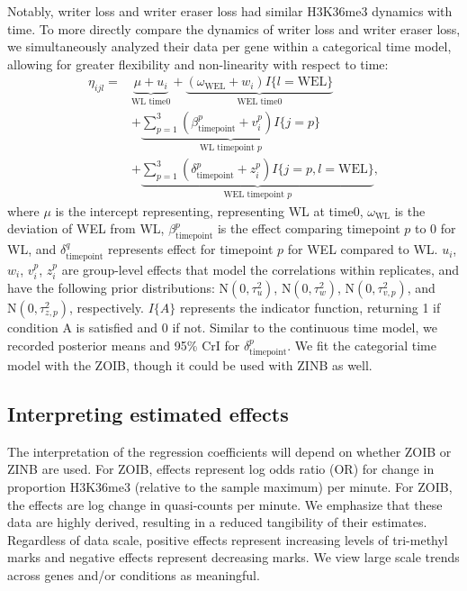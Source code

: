 \documentclass[12pt]{extarticle}
\begin{document}
Notably, writer loss and writer eraser loss had similar H3K36me3 dynamics with time. To more directly compare the dynamics of writer loss and writer eraser loss, we simultaneously analyzed their data per gene within a categorical time model, allowing for greater flexibility and non-linearity with respect to time:
\begin{align}
	\eta_{ijl} = &\underbrace{\mu + u_{i}}_{\text{WL time0}} + \underbrace{(\omega_{\text{WEL}} + w_{i})I\{l = \text{WEL}\}}_{\text{WEL time0}} \\ 
	&+ \underbrace{\sum_{p = 1}^{3}(\beta_{\text{timepoint}}^{p} + v_{i}^{p})I\{j = p\}}_{\text{WL timepoint }p} \nonumber \\ 
	&+ \underbrace{\sum_{p = 1}^{3}(\delta_{\text{timepoint}}^{p} + z_{i}^{p})I\{j = p, l = \text{WEL}\}}_{\text{WEL timepoint }p},\nonumber
\end{align}
where $\mu$ is the intercept representing, representing WL at time0, $\omega_{\text{WL}}$ is the deviation of WEL from WL, $\beta_{\text{timepoint}}^{p}$ is the effect comparing timepoint $p$ to $0$ for WL, and $\delta_{\text{timepoint}}^{q}$ represents effect for timepoint $p$ for WEL compared to WL. $u_{i}$, $w_{i}$, $v_{i}^{p}$, $z_{i}^{p}$ are group-level effects that model the correlations within replicates, and have the following prior distributions: $\text{N}(0, \tau^{2}_{u})$, $\text{N}(0, \tau^{2}_{w})$, $\text{N}(0, \tau^{2}_{v,p})$, and $\text{N}(0, \tau^{2}_{z,p})$, respectively. $I\{A\}$ represents the indicator function, returning 1 if condition A is satisfied and 0 if not. Similar to the continuous time model, we recorded posterior means and 95\% CrI for $\delta_{\text{timepoint}}^{p}$. We fit the categorial time model with the ZOIB, though it could be used with ZINB as well.

\subsection*{Interpreting estimated effects}

The interpretation of the regression coefficients will depend on whether ZOIB or ZINB are used. For ZOIB, effects represent log odds ratio (OR) for change in proportion H3K36me3 (relative to the sample maximum) per minute. For ZOIB, the effects are log change in quasi-counts per minute. We emphasize that these data are highly derived, resulting in a reduced tangibility of their estimates. Regardless of data scale, positive effects represent increasing levels of tri-methyl marks and negative effects represent decreasing marks. We view large scale trends across genes and/or conditions as meaningful.
\end{document}
